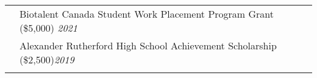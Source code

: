 \documentclass[letterpaper, 11pt]{article}
\begin{document}
\begin{longtable}{p{1.3in}p{4.8in}}
	{\color{Blue}{Honours and}}
	 & Biotalent Canada Student Work Placement Program Grant (\$5,000) \hfill \textit{2021}                                                                                                                                                                                                                                                                                                      \\
	{\color{Blue}{Scholarships}}
	 & Alexander Rutherford High School Achievement Scholarship (\$2,500)\hfill \textit{2019}                                                                                                                                                                                                                                                                                                    \\
	 &                                                                                                                                                                                                                                                                                                                                                                                           \\

\end{longtable}
\end{document}
